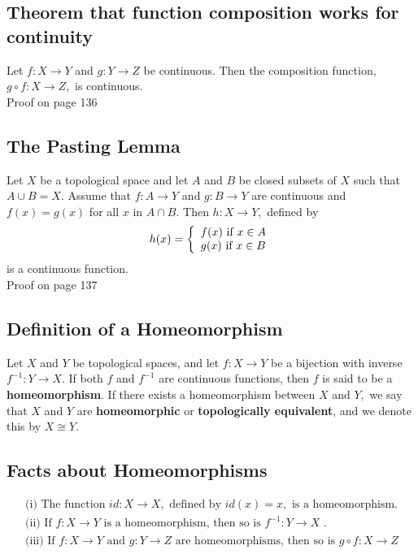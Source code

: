 \documentclass[12pt]{article}
\begin{document}
	\subsection{Theorem that function composition works for continuity}
		Let $f : X \rightarrow Y$ and $g : Y \rightarrow Z$ be continuous. Then the
		composition function, $g \circ f : X \rightarrow Z ,$ is continuous.\\
		\subitem Proof on page 136
	\subsection{The Pasting Lemma}
		Let $ X $ be a topological space and let $ A $ and $B$ be closed subsets of $X$ such that $A \cup B = X .$ Assume that $f : A \rightarrow Y$ and $g : B \rightarrow Y$ are continuous and $f ( x ) = g ( x )$ for all $x$ in $A \cap B .$ Then $h : X \rightarrow Y ,$ defined by
			\[h ( x ) = \left\{ \begin{array} { l l } { f ( x ) \text { if } x \in A } \\ { g ( x ) \text { if } x \in B } \end{array} \right.\]
		is a continuous function.\\
		\subitem Proof on page 137
	\subsection{Definition of a Homeomorphism}
		Let $X$ and $Y$ be topological spaces, and let $f : X \rightarrow Y$ be a bijection with inverse $f ^ { - 1 } : Y \rightarrow X .$ If both $f$ and $f ^ { - 1 }$ are continuous functions, then $f$ is said to be a \textbf{homeomorphism}. If there exists a homeomorphism between $X$ and $Y ,$ we say that $X$ and $Y$ are \textbf{homeomorphic} or \textbf{topologically equivalent}, and we denote this by $X \cong Y .$
	\subsection{Facts about Homeomorphisms}
		\[\begin{array} { l } { \text { (i) The function } i d : X \rightarrow X , \text { defined by } i d ( x ) = x , \text { is a homeomorphism. } } \\
		 { \text { (ii) If } f : X \rightarrow Y \text { is a homeomorphism, then so is } f ^ { - 1 } : Y \rightarrow X \text { . } } \\
		  { \text { (iii) If } f : X \rightarrow Y \text { and } g : Y \rightarrow Z \text { are homeomorphisms, then so is }  g \circ f : X \rightarrow Z } \end{array}\]
\end{document}
